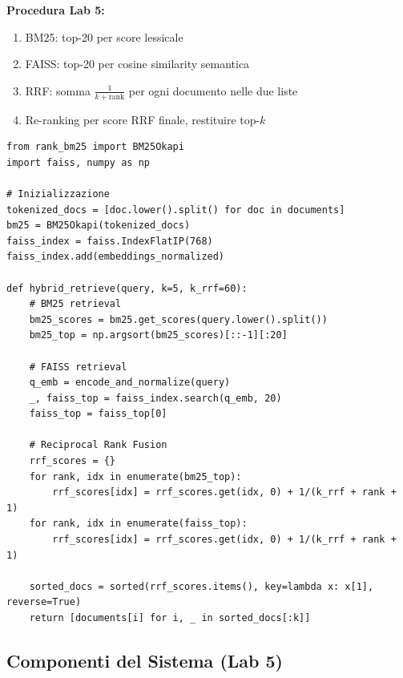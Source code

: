 \documentclass[12pt,a4paper]{article}
\begin{document}
\textbf{Procedura Lab 5:}
\begin{enumerate}
  \item BM25: top-20 per score lessicale
  \item FAISS: top-20 per cosine similarity semantica
  \item RRF: somma $\frac{1}{k+\text{rank}}$ per ogni documento nelle due liste
  \item Re-ranking per score RRF finale, restituire top-$k$
\end{enumerate}

\begin{codebox}
\begin{lstlisting}[style=python]
from rank_bm25 import BM25Okapi
import faiss, numpy as np

# Inizializzazione
tokenized_docs = [doc.lower().split() for doc in documents]
bm25 = BM25Okapi(tokenized_docs)
faiss_index = faiss.IndexFlatIP(768)
faiss_index.add(embeddings_normalized)

def hybrid_retrieve(query, k=5, k_rrf=60):
    # BM25 retrieval
    bm25_scores = bm25.get_scores(query.lower().split())
    bm25_top = np.argsort(bm25_scores)[::-1][:20]

    # FAISS retrieval
    q_emb = encode_and_normalize(query)
    _, faiss_top = faiss_index.search(q_emb, 20)
    faiss_top = faiss_top[0]

    # Reciprocal Rank Fusion
    rrf_scores = {}
    for rank, idx in enumerate(bm25_top):
        rrf_scores[idx] = rrf_scores.get(idx, 0) + 1/(k_rrf + rank + 1)
    for rank, idx in enumerate(faiss_top):
        rrf_scores[idx] = rrf_scores.get(idx, 0) + 1/(k_rrf + rank + 1)

    sorted_docs = sorted(rrf_scores.items(), key=lambda x: x[1], reverse=True)
    return [documents[i] for i, _ in sorted_docs[:k]]
\end{lstlisting}
\end{codebox}

\subsection{Componenti del Sistema (Lab 5)}
\end{document}

